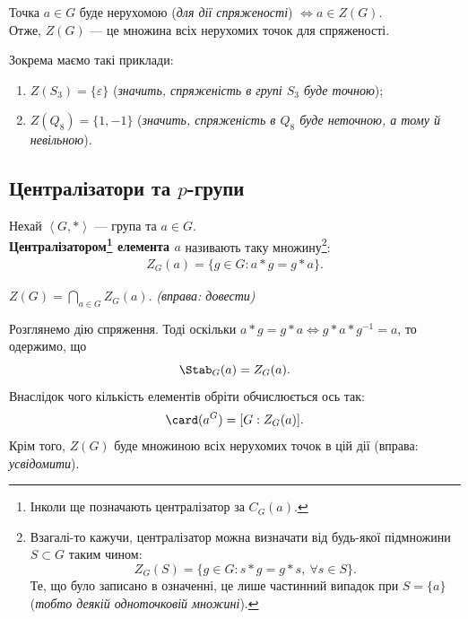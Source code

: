 \documentclass{math_library}
\begin{document}
\begin{remark}
Точка $a \in G$ буде нерухомою (\textit{для дії спряженості}) $\iff a \in Z(G)$.\\
Отже, $Z(G)$ --- це множина всіх нерухомих точок для спряженості.
\end{remark}

\begin{example}
Зокрема маємо такі приклади:
\begin{enumerate}[nosep,wide=0pt]
\item $Z(S_3) = \{\varepsilon\}$ (\textit{значить, спряженість в групі $S_3$ буде точною});
\item $Z(Q_8) = \{1,-1\}$ (\textit{значить, спряженість в $Q_8$ буде неточною, а тому й невільною}).
\end{enumerate}
\end{example}

\subsection{Централізатори та $p$-групи}
\begin{definition}
Нехай $\left< G, *\right>$ --- група та $a \in G$.\\
\textbf{Централізатором\footnote{Інколи ще позначають централізатор за $C_G(a)$.} елемента $a$} називають таку множину\footnote{Взагалі-то кажучи, централізатор можна визначати від будь-якої підмножини $S \subset G$ таким чином: 
\[
Z_G(S) = \{g \in G: s*g = g*s,\ \forall s \in S\}.
\]
Те, що було записано в означенні, це лише частинний випадок при $S = \{a\}$ (\textit{тобто деякій одноточковій множині}).}:
\begin{align*}
Z_G(a) = \{g \in G: a*g = g*a\}.
\end{align*}
\end{definition}

\begin{remark}
$Z(G) = \displaystyle\bigcap_{a \in G} Z_G(a)$. \textit{(вправа: довести)}
\end{remark}

\begin{remark}
Розглянемо дію спряження. Тоді оскільки $a*g = g*a \iff g*a*g^{-1} = a$, то одержимо, що 
\[
\Stab_G(a) = Z_G(a).
\]
Внаслідок чого кількість елементів обріти обчислюється ось так:
\[
\card (a^G) = [G : Z_G(a)].
\]
Крім того, $Z(G)$ буде множиною всіх нерухомих точок в цій дії (вправа: \textit{усвідомити}).
\end{remark}
\end{document}
